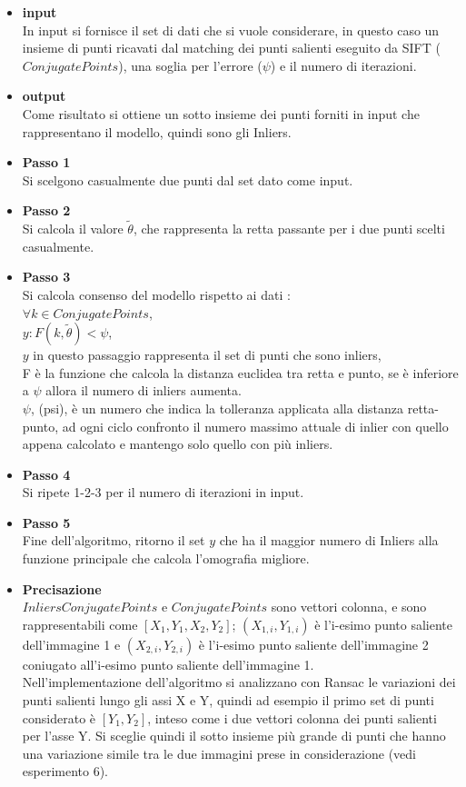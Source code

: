 \documentclass[11pt, oneside]{article}   	%
\begin{document}
\begin{itemize}
	\item \textbf{input} \\
	In input si fornisce il set di dati che si vuole considerare, in questo caso un insieme di punti ricavati dal matching dei punti salienti eseguito da SIFT ($ConjugatePoints$), una soglia per l'errore ($\psi$) e il numero di iterazioni.
	\item \textbf{output} \\
	Come risultato si ottiene un sotto insieme dei punti forniti in input che rappresentano il modello, quindi sono gli Inliers.
	\item \textbf{Passo 1} \\
	Si scelgono casualmente due punti dal set dato come input.
	\item \textbf{Passo 2} \\
	Si calcola il valore $\tilde{\theta}$, che rappresenta la retta passante per i due punti scelti casualmente.
	\item \textbf{Passo 3} \\
	Si calcola consenso del modello rispetto ai dati : \\
	$\forall k \in{ConjugatePoints} $,\\
	$ y :  F(k,\tilde{\theta})< \psi$,\\ $y$ in questo passaggio rappresenta il set di punti che sono inliers, \\ F è la funzione che calcola la distanza euclidea tra retta e punto, se è inferiore a $\psi$ allora il numero di inliers aumenta.\\ $\psi$, (psi), è un numero che indica la tolleranza applicata alla distanza retta-punto, ad ogni ciclo confronto il numero massimo attuale di inlier con quello appena calcolato e mantengo solo quello con più inliers.
	\item \textbf{Passo 4} \\
	Si ripete 1-2-3 per il numero di iterazioni in input.
	\item \textbf{Passo 5} \\
	Fine dell'algoritmo, ritorno il set $y$ che ha il maggior numero di Inliers alla funzione principale che calcola l'omografia migliore.
	\item \textbf{Precisazione}\\
	$InliersConjugatePoints$ e $ConjugatePoints$ sono vettori colonna, e sono rappresentabili come $[X_{1},Y_{1},X_{2},Y_{2}]$; $(X_{1,i},Y_{1,i})$ è l'i-esimo punto saliente dell'immagine 1 e $(X_{2,i},Y_{2,i})$ è l'i-esimo punto saliente dell'immagine 2 coniugato all'i-esimo punto saliente dell'immagine 1.\\
	
	Nell'implementazione dell'algoritmo si analizzano con Ransac le variazioni dei punti salienti lungo gli assi X e Y,
	quindi ad esempio il primo set di punti considerato è $[Y_1,Y_2]$, inteso come i due vettori colonna dei punti salienti per l'asse Y.
	Si sceglie quindi il sotto insieme  più grande di punti che hanno una variazione simile tra le due immagini prese in considerazione (vedi esperimento 6).

\end{itemize}
\end{document}
